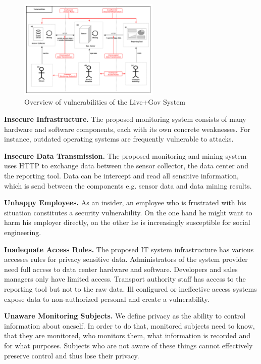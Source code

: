\documentclass[runningheads,a4paper]{llncs}
\begin{document}
\begin{figure}
\centering
\includegraphics[width=0.6\textwidth]{diagrams/png/vulnerabilities.png}

\caption{Overview of vulnerabilities of the Live+Gov System }
\label{figure:Live+Gov Vulnerabilities}
\end{figure}

\textbf{Insecure Infrastructure.}
The proposed monitoring system consists of many hardware and software components, each with its own concrete weaknesses. For instance, outdated operating systems are frequently vulnerable to attacks.

\textbf{Insecure Data Transmission.}
The proposed monitoring and mining system uses HTTP to exchange data between the sensor collector, the data center and the reporting tool.
Data can be intercept and read all sensitive information, which is send between the components e.g. sensor data and data mining results.

\textbf{Unhappy Employees.}
As an insider, an employee who is frustrated with his situation constitutes a security vulnerability. On the one hand he might
want to harm his employer directly, on the other he is increasingly
susceptible for social engineering.

\textbf{Inadequate Access Rules.}
The proposed IT system infrastructure has various accesses rules for privacy sensitive data.
Administrators of the system provider need full access to data center hardware and software.
Developers and sales managers only have limited access.
Transport authority staff has access to the reporting tool but not to the raw data.
Ill configured or ineffective access systems expose data to non-authorized personal and create a vulnerability.

\textbf{Unaware Monitoring Subjects.}
We define privacy as the ability to control information about oneself. 
In order to do that, monitored subjects need to know, that
they are monitored, who monitors them, what information is recorded
and for what purposes.  Subjects who are not aware of these things
cannot effectively preserve control and thus lose their privacy. 
\end{document}
